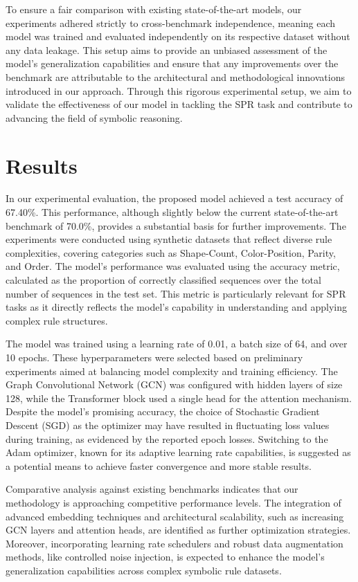 \documentclass{article}
\begin{document}
To ensure a fair comparison with existing state-of-the-art models, our experiments adhered strictly to cross-benchmark independence, meaning each model was trained and evaluated independently on its respective dataset without any data leakage. This setup aims to provide an unbiased assessment of the model's generalization capabilities and ensure that any improvements over the benchmark are attributable to the architectural and methodological innovations introduced in our approach. Through this rigorous experimental setup, we aim to validate the effectiveness of our model in tackling the SPR task and contribute to advancing the field of symbolic reasoning.

\section{Results}
In our experimental evaluation, the proposed model achieved a test accuracy of 67.40\%. This performance, although slightly below the current state-of-the-art benchmark of 70.0\%, provides a substantial basis for further improvements. The experiments were conducted using synthetic datasets that reflect diverse rule complexities, covering categories such as Shape-Count, Color-Position, Parity, and Order. The model's performance was evaluated using the accuracy metric, calculated as the proportion of correctly classified sequences over the total number of sequences in the test set. This metric is particularly relevant for SPR tasks as it directly reflects the model's capability in understanding and applying complex rule structures.

The model was trained using a learning rate of 0.01, a batch size of 64, and over 10 epochs. These hyperparameters were selected based on preliminary experiments aimed at balancing model complexity and training efficiency. The Graph Convolutional Network (GCN) was configured with hidden layers of size 128, while the Transformer block used a single head for the attention mechanism. Despite the model's promising accuracy, the choice of Stochastic Gradient Descent (SGD) as the optimizer may have resulted in fluctuating loss values during training, as evidenced by the reported epoch losses. Switching to the Adam optimizer, known for its adaptive learning rate capabilities, is suggested as a potential means to achieve faster convergence and more stable results.

Comparative analysis against existing benchmarks indicates that our methodology is approaching competitive performance levels. The integration of advanced embedding techniques and architectural scalability, such as increasing GCN layers and attention heads, are identified as further optimization strategies. Moreover, incorporating learning rate schedulers and robust data augmentation methods, like controlled noise injection, is expected to enhance the model's generalization capabilities across complex symbolic rule datasets.
\end{document}

